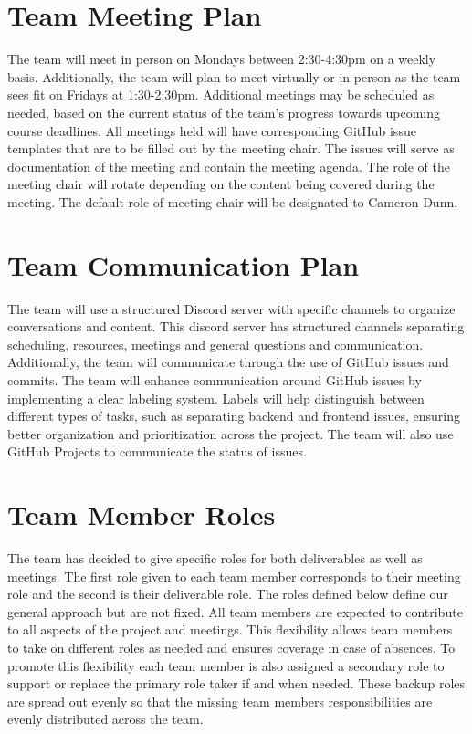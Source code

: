 \documentclass{article}
\begin{document}
\section{Team Meeting Plan}

The team will meet in person on Mondays between 2:30-4:30pm on a weekly basis. 
Additionally, the team will plan to meet virtually or in person as the team sees fit on Fridays at 1:30-2:30pm.
Additional meetings may be scheduled as needed, based on the current status of the team's progress towards upcoming course deadlines. 
All meetings held will have corresponding GitHub issue templates that are to be filled out by the meeting chair. The issues will serve as documentation of the meeting and contain the meeting agenda.
The role of the meeting chair will rotate depending on the content being covered during the meeting. 
The default role of meeting chair will be designated to Cameron Dunn. 

\section{Team Communication Plan}

The team will use a structured Discord server with specific channels to organize conversations and content. 
This discord server has structured channels separating scheduling, resources, meetings and general questions and communication. 
Additionally, the team will communicate through the use of GitHub issues and commits. 
The team will enhance communication around GitHub issues by implementing a clear labeling system. 
Labels will help distinguish between different types of tasks, such as separating backend and frontend issues, ensuring better organization and prioritization across the project. 
The team will also use GitHub Projects to communicate the status of issues. 

\section{Team Member Roles}

The team has decided to give specific roles for both deliverables as well as meetings. 
The first role given to each team member corresponds to their meeting role and the second is their deliverable role.
The roles defined below define our general approach but are not fixed.
All team members are expected to contribute to all aspects of the project and meetings.
This flexibility allows team members to take on different roles as needed and ensures coverage in case of absences.
To promote this flexibility each team member is also assigned a secondary role to support or replace the primary role taker if and when needed.
These backup roles are spread out evenly so that the missing team members responsibilities are evenly distributed across the team.
\end{document}
